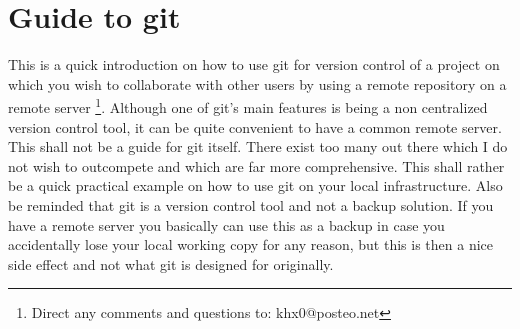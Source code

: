 \documentclass{article}
\begin{document}
\section*{Guide to git}
\setcounter{section}{1}

This is a quick introduction on how to use git for version control of a project on which you wish to collaborate with other users by using a remote repository on a remote server \footnote{Direct any comments and questions to: khx0@posteo.net}. Although one of git's main features is being a non centralized version control tool, it can be quite convenient to have a common remote server.
This shall not be a guide for git itself. There exist too many out there which I do not wish to outcompete and which are far more comprehensive. This shall rather be a quick practical example on how to use git on your local infrastructure. Also be reminded that git is a version control tool and not a backup solution. If you have a remote server you basically can use this as a backup in case you accidentally lose your local working copy for any reason, but this is then a nice side effect and not what git is designed for originally.
\end{document}
